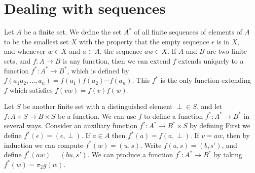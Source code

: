 \documentclass[10pt]{amsart}
\newcommand{\C}{\mathcal{C}}
\theoremstyle{definition}
\newtheorem{example}[theorem]{Example}
\begin{document}

\section{Dealing with sequences}

Let $A$ be a finite set. We define the set $A^*$ of all finite sequences of elements of $A$ to be the smallest set $X$ with the property that the empty sequence $\epsilon$ is in $X$, and whenever $w\in X$ and $a\in A$, the sequence $aw\in X$. If $A$ and $B$ are two finite sets, and $f:A\to B$ is any function, then we can extend $f$ extends uniquely to a function $f^*:A^*\to B^*$, which is defined by $f(a_1a_2,...,a_n)=f(a_1)f(a_2)\cdots f(a_n)$. This $f^*$ is the only function extending $f$ which satisfies $f(vw)=f(v)f(w)$.

Let $S$ be another finite set with a distinguished element $\perp\in S$, and let $f:A\times S\to B\times S$ be a function. We can use $f$ to define a function $f^*:A^*\to B^*$ in several ways. Consider an auxiliary function $f^*:A^*\to B^*\times S$ by defining First we define $f^*(\epsilon)=(\epsilon, \perp)$. If $a\in A$ then $f^*(a)=f(a, \perp)$. If $v=aw$, then by induction we can compute $f^*(w)=(u, s)$. Write $f(a, s)=(b, s')$, and define $f^*(aw)=(bu, s')$.  We can produce a function $f^*:A^*\to B^*$ by taking $f^*(w)=\pi_2 g(w)$.
\end{document}
